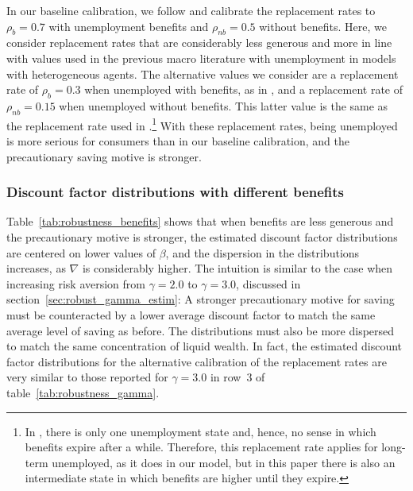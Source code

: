 \documentclass[\econtexRoot/EGMN]{subfiles}
\begin{document}
In our baseline calibration, we follow \cite{rothstein2017scraping} and calibrate the replacement rates to $\rho_b=0.7$ with unemployment benefits and $\rho_{nb}=0.5$ without benefits. Here, we consider replacement rates that are considerably less generous and more in line with values used in the previous macro literature with unemployment in models with heterogeneous agents. The alternative values we consider are a replacement rate of $\rho_{b}=0.3$ when unemployed with benefits, as in \cite{carroll2020modeling}, and a replacement rate of $\rho_{nb}=0.15$ when unemployed without benefits. This latter value is the same as the replacement rate used in \cite{den2010computational}.\footnote{In \cite{den2010computational}, there is only one unemployment state and, hence, no sense in which benefits expire after a while. Therefore, this replacement rate applies for long-term unemployed, as it does in our model, but in this paper there is also an intermediate state in which benefits are higher until they expire.} With these replacement rates, being unemployed is more serious for consumers than in our baseline calibration, and the precautionary saving motive is stronger.

\subsubsection{Discount factor distributions with different benefits}
\notinsubfile{\label{sec:robust_benefits_estim}}

Table~\ref{tab:robustness_benefits} shows that when benefits are less generous and the precautionary motive is stronger, the estimated discount factor distributions are centered on lower values of $\beta$, and the dispersion in the distributions increases, as $\nabla$ is considerably higher. The intuition is similar to the case when increasing risk aversion from $\gamma=2.0$ to $\gamma=3.0$, discussed in section~\ref{sec:robust_gamma_estim}: A stronger precautionary motive for saving must be counteracted by a lower average discount factor to match the same average level of saving as before. The distributions must also be more dispersed to match the same concentration of liquid wealth. In fact, the estimated discount factor distributions for the alternative calibration of the replacement rates are very similar to those reported for $\gamma=3.0$ in row~3 of table~\ref{tab:robustness_gamma}.
\end{document}
